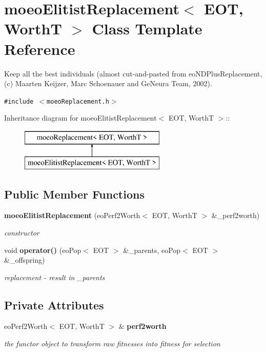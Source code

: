 \section{moeo\-Elitist\-Replacement$<$ EOT, Worth\-T $>$ Class Template Reference}
\label{classmoeoElitistReplacement}
Keep all the best individuals (almost cut-and-pasted from eo\-NDPlus\-Replacement, (c) Maarten Keijzer, Marc Schoenauer and Ge\-Neura Team, 2002).  


{\tt \#include $<$moeo\-Replacement.h$>$}

Inheritance diagram for moeo\-Elitist\-Replacement$<$ EOT, Worth\-T $>$::\begin{figure}[H]
\begin{center}
\leavevmode
\includegraphics[height=2cm]{classmoeoElitistReplacement}
\end{center}
\end{figure}
\subsection*{Public Member Functions}
\begin{CompactItemize}
\item 
{\bf moeo\-Elitist\-Replacement} (eo\-Perf2Worth$<$ EOT, Worth\-T $>$ \&\_\-perf2worth)
\begin{CompactList}\small\item\em constructor \item\end{CompactList}\item 
void {\bf operator()} (eo\-Pop$<$ EOT $>$ \&\_\-parents, eo\-Pop$<$ EOT $>$ \&\_\-offspring)
\begin{CompactList}\small\item\em replacement - result in \_\-parents \item\end{CompactList}\end{CompactItemize}
\subsection*{Private Attributes}
\begin{CompactItemize}
\item 
eo\-Perf2Worth$<$ EOT, Worth\-T $>$ \& {\bf perf2worth}\label{classmoeoElitistReplacement_020f0e0b6b88a0081d922cca5b05990e}

\begin{CompactList}\small\item\em the functor object to transform raw fitnesses into fitness for selection \item\end{CompactList}\end{CompactItemize}



